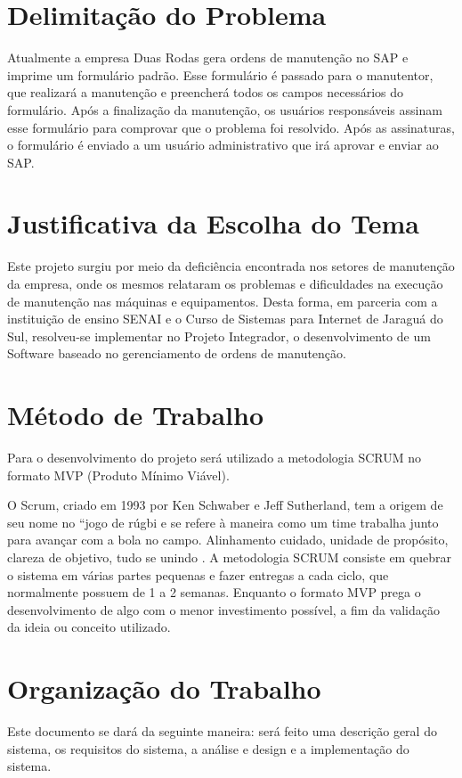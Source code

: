 \section{Delimitação do Problema}
Atualmente a empresa Duas Rodas gera ordens de manutenção no SAP e imprime um formulário padrão. Esse formulário é passado para o manutentor, que realizará a manutenção e preencherá todos os campos necessários do formulário. Após a finalização da manutenção, os usuários responsáveis assinam esse formulário para comprovar que o problema foi resolvido. Após as assinaturas, o formulário é enviado a um usuário administrativo que irá aprovar e enviar ao SAP.

\section{Justificativa da Escolha do Tema}
Este projeto surgiu por meio da deficiência encontrada nos setores de manutenção da empresa, onde os mesmos relataram os problemas e dificuldades na execução de manutenção nas máquinas e equipamentos. Desta forma, em parceria com a instituição de ensino SENAI e o Curso de Sistemas para Internet de Jaraguá do Sul, resolveu-se implementar no Projeto Integrador, o desenvolvimento de um Software baseado no gerenciamento de ordens de manutenção.



\section{Método de Trabalho}
Para o desenvolvimento do projeto será utilizado a metodologia SCRUM no formato MVP (Produto Mínimo Viável).

O Scrum, criado em 1993 por Ken Schwaber e Jeff Sutherland, tem a origem de seu nome no “jogo de rúgbi e se refere à maneira como um time trabalha junto para avançar com a bola no campo. Alinhamento cuidado, unidade de propósito, clareza de objetivo, tudo se unindo \cite{rocha2015metodologia}.
A metodologia SCRUM consiste em quebrar o sistema em várias partes pequenas e fazer entregas a cada ciclo, que normalmente possuem de 1 a 2 semanas.
Enquanto o formato MVP prega o desenvolvimento de algo com o menor investimento possível, a fim da validação da ideia ou conceito utilizado.

\section{Organização do Trabalho}
Este documento se dará da seguinte maneira: será feito uma descrição geral do sistema, os requisitos do sistema, a análise e design e a implementação do sistema.

